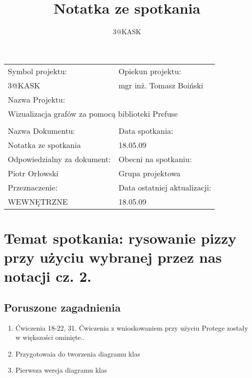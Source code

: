 \documentclass[a4paper,10pt]{article}
\title{Notatka ze spotkania}
\author{3@KASK}
\begin{document}



\maketitle


\begin{center}
\begin{tabular}{|p{7cm}|p{7cm}|}
\hline
Symbol projektu: & Opiekun projektu:   \tabularnewline 
3@KASK & mgr inż. Tomasz Boiński    \tabularnewline \hline
\multicolumn{2}{|l|}{Nazwa Projektu: } \tabularnewline
\multicolumn{2}{|l|}{Wizualizacja grafów za pomocą biblioteki Prefuse } \tabularnewline 
\hline
\multicolumn{2}{l}{ } \tabularnewline %
\hline 
Nazwa Dokumentu: & Data spotkania:   \tabularnewline 
Notatka ze spotkania & 18.05.09 \tabularnewline \hline
Odpowiedzialny za dokument: & Obecni na spotkaniu:   \tabularnewline 
Piotr Orłowski & Grupa projektowa \tabularnewline \hline
Przeznaczenie: & Data ostatniej aktualizacji:   \tabularnewline 
WEWNĘTRZNE & 18.05.09 \tabularnewline \hline
\end{tabular}
\end{center}



\section{Temat spotkania: rysowanie pizzy przy użyciu wybranej przez nas notacji cz. 2.}

\subsection{Poruszone zagadnienia}
\begin{enumerate}
\item Ćwiczenia 18-22, 31. Ćwiczenia z wnioskowaniem przy użyciu Protege zostały w większości ominięte..
\item Przygotowaia do tworzenia diagramu klas
\item Pierwsza wersja diagramu klas
\end{enumerate}
\end{document}
